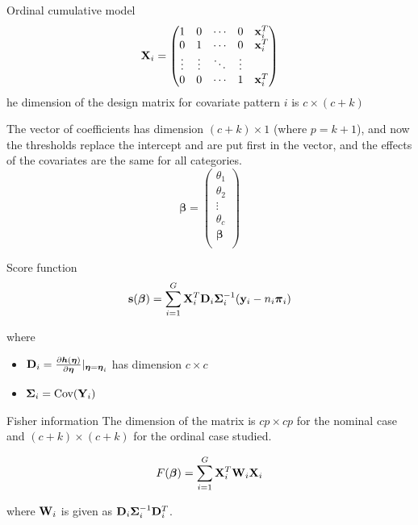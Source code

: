 \documentclass[
  ignorenonframetext,
]{beamer}
\providecommand{\tightlist}{%
  \setlength{\itemsep}{0pt}\setlength{\parskip}{0pt}}
\begin{document}
\begin{frame}
\begin{block}{Ordinal cumulative model}
\protect\hypertarget{ordinal-cumulative-model}{}
\[{\bf X}_i=\begin{pmatrix}1 & 0 & \cdots & 0 & {\bf x}_i^T\\
0 & 1 & \cdots & 0 & {\bf x}_i^T\\
\vdots & \vdots & \ddots & \vdots \\
0 & 0 & \cdots & 1 & {\bf x}_i^T\\
\end{pmatrix}\] he dimension of the design matrix for covariate pattern
\(i\) is \(c \times (c+k)\)

The vector of coefficients has dimension \((c+ k) \times 1\) (where
\(p=k+1\)), and now the thresholds replace the intercept and are put
first in the vector, and the effects of the covariates are the same for
all categories.
\[{\boldsymbol \beta}=\begin{pmatrix}\theta_1\\ \theta_2 \\ \vdots \\ \theta_c \\{\boldsymbol \beta}\\ \end{pmatrix}\]
\end{block}
\end{frame}

\begin{frame}
\begin{block}{Score function}
\protect\hypertarget{score-function}{}
\[{\bf s}({\boldsymbol \beta})=\sum_{i=1}^G {\bf X}_i^T {\bf D}_i {\boldsymbol \Sigma}_i^{-1}({\bf y}_i-n_i{\boldsymbol \pi}_i)\]

where

\begin{itemize}
\tightlist
\item
  \({\bf D}_i=\frac{\partial {\boldsymbol h}({\boldsymbol \eta})}{\partial {\boldsymbol \eta}}\lvert_{{\boldsymbol \eta}={\boldsymbol \eta}_i}\)
  has dimension \(c \times c\)
\item
  \({\boldsymbol \Sigma}_i=\text{Cov}({\bf Y}_i)\)
\end{itemize}
\end{block}
\end{frame}

\begin{frame}
\begin{block}{Fisher information}
\protect\hypertarget{fisher-information}{}
The dimension of the matrix is \(cp\times cp\) for the nominal case and
\((c+k) \times (c+k)\) for the ordinal case studied.

\[F({\boldsymbol \beta})=\sum_{i=1}^G {\bf X}_i^T {\bf W}_i {\bf X}_i\]

where \({\bf W}_i\) is given as
\({\bf D}_i{\boldsymbol \Sigma}_i^{-1}{\bf D}_i^T\).
\end{block}
\end{frame}
\end{document}
